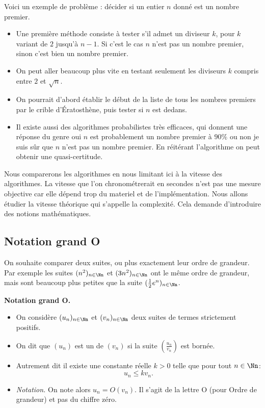 \documentclass[11pt,class=report,crop=false]{standalone}
\begin{document}
Voici un exemple de problème : décider si un entier $n$ donné est un nombre premier.
\begin{itemize}
  \item Une première méthode consiste à tester s'il admet un diviseur $k$, pour $k$ variant de $2$ jusqu'à $n-1$. Si c'est le cas $n$ n'est pas un nombre premier, sinon c'est bien un nombre premier.
  \item On peut aller beaucoup plus vite en testant seulement les diviseurs $k$
  compris entre $2$ et $\sqrt n$.
  \item On pourrait d'abord établir le début de la liste de tous les nombres premiers par le crible d'Ératosthène, puis tester si $n$ est dedans.
  \item Il existe aussi des algorithmes probabilistes très efficaces,
  qui donnent une réponse du genre \og{}oui $n$ est probablement un nombre premier à $90\%$\fg{} ou \og{}non je suis sûr que $n$ n'est pas un nombre premier\fg{}.
  En réitérant l'algorithme on peut obtenir une quasi-certitude.
\end{itemize}

Nous comparerons les algorithmes en nous limitant ici à la \og{}vitesse\fg{} des algorithmes.
La vitesse que l'on chronométrerait en secondes n'est pas une mesure objective car elle dépend trop du materiel et de l'implémentation. Nous allons étudier la vitesse théorique qui s'appelle la \og{}complexité\fg{}.
Cela demande d'introduire des notions mathématiques.


\subsection{Notation \og{}grand O\fg{}}

On souhaite comparer deux suites, ou plus exactement leur ordre de grandeur. Par exemple les suites $(n^2)_{n\in\Nn}$ et $(3n^2)_{n\in\Nn}$ ont le même ordre de grandeur, mais sont beaucoup plus petites que la suite $(\frac12 e^n)_{n\in\Nn}$. 

\textbf{Notation \og{}grand O\fg{}.}
\begin{itemize}
	\item On considère $(u_n)_{n\in\Nn}$ et $(v_n)_{n\in\Nn}$ deux suites de termes strictement positifs.
	\item On dit que $(u_n)$ est un  de $(v_n)$ si la suite $\left(\frac{u_n}{v_n}\right)$ est bornée.
    \item Autrement dit il existe une constante réelle $k>0$ telle que pour tout $n\in \Nn$:
$$u_n \le k v_n.$$
    \item \emph{Notation.} On note alors $u_n = O(v_n)$. Il s'agit de la lettre \og{}O\fg{} (pour Ordre de grandeur) et pas du chiffre zéro.
\end{itemize}
\end{document}
